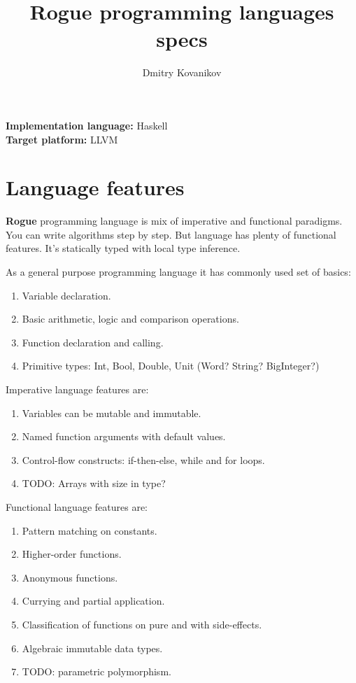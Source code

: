 \documentclass[a4paper]{article}
\title{\textbf{Rogue} programming languages specs}
\author{Dmitry Kovanikov}
\date{}
\begin{document}
\maketitle

\textbf{Implementation language:} Haskell\\

\textbf{Target platform:} LLVM\\

\section*{Language features}

\textbf{Rogue} programming language is mix of imperative and functional paradigms. You can write algorithms step by step. But language has plenty of functional features. It's statically typed with local type inference. 

As a general purpose programming language it has commonly used set of basics:

\begin{enumerate}
\item Variable declaration.
\item Basic arithmetic, logic and comparison operations.
\item Function declaration and calling.
\item Primitive types: Int, Bool, Double, Unit (Word? String? BigInteger?)
\end{enumerate}

Imperative language features are:

\begin{enumerate}
\item Variables can be mutable and immutable.
\item Named function arguments with default values.
\item Control-flow constructs: if-then-else, while and for loops.
\item TODO: Arrays with size in type?
\end{enumerate}

Functional language features are:

\begin{enumerate}
\item Pattern matching on constants.
\item Higher-order functions.
\item Anonymous functions.
\item Currying and partial application.
\item Classification of functions on pure and with side-effects.
\item Algebraic immutable data types.
\item TODO: parametric polymorphism.
\end{enumerate}
\end{document}
